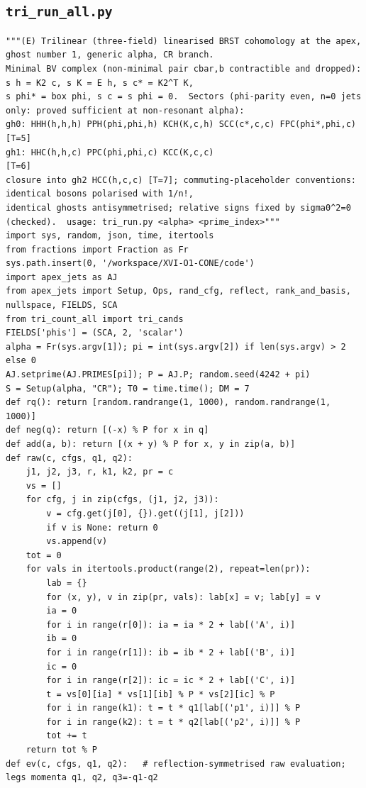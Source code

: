 \documentclass[10pt]{article}
\begin{document}
\subsection{\texttt{tri\_run\_all.py}}
\begin{lstlisting}
"""(E) Trilinear (three-field) linearised BRST cohomology at the apex, ghost number 1, generic alpha, CR branch.
Minimal BV complex (non-minimal pair cbar,b contractible and dropped): s h = K2 c, s K = E h, s c* = K2^T K,
s phi* = box phi, s c = s phi = 0.  Sectors (phi-parity even, n=0 jets only: proved sufficient at non-resonant alpha):
gh0: HHH(h,h,h) PPH(phi,phi,h) KCH(K,c,h) SCC(c*,c,c) FPC(phi*,phi,c)  [T=5]
gh1: HHC(h,h,c) PPC(phi,phi,c) KCC(K,c,c)                               [T=6]
closure into gh2 HCC(h,c,c) [T=7]; commuting-placeholder conventions: identical bosons polarised with 1/n!,
identical ghosts antisymmetrised; relative signs fixed by sigma0^2=0 (checked).  usage: tri_run.py <alpha> <prime_index>"""
import sys, random, json, time, itertools
from fractions import Fraction as Fr
sys.path.insert(0, '/workspace/XVI-O1-CONE/code')
import apex_jets as AJ
from apex_jets import Setup, Ops, rand_cfg, reflect, rank_and_basis, nullspace, FIELDS, SCA
from tri_count_all import tri_cands
FIELDS['phis'] = (SCA, 2, 'scalar')
alpha = Fr(sys.argv[1]); pi = int(sys.argv[2]) if len(sys.argv) > 2 else 0
AJ.setprime(AJ.PRIMES[pi]); P = AJ.P; random.seed(4242 + pi)
S = Setup(alpha, "CR"); T0 = time.time(); DM = 7
def rq(): return [random.randrange(1, 1000), random.randrange(1, 1000)]
def neg(q): return [(-x) % P for x in q]
def add(a, b): return [(x + y) % P for x, y in zip(a, b)]
def raw(c, cfgs, q1, q2):
    j1, j2, j3, r, k1, k2, pr = c
    vs = []
    for cfg, j in zip(cfgs, (j1, j2, j3)):
        v = cfg.get(j[0], {}).get((j[1], j[2]))
        if v is None: return 0
        vs.append(v)
    tot = 0
    for vals in itertools.product(range(2), repeat=len(pr)):
        lab = {}
        for (x, y), v in zip(pr, vals): lab[x] = v; lab[y] = v
        ia = 0
        for i in range(r[0]): ia = ia * 2 + lab[('A', i)]
        ib = 0
        for i in range(r[1]): ib = ib * 2 + lab[('B', i)]
        ic = 0
        for i in range(r[2]): ic = ic * 2 + lab[('C', i)]
        t = vs[0][ia] * vs[1][ib] % P * vs[2][ic] % P
        for i in range(k1): t = t * q1[lab[('p1', i)]] % P
        for i in range(k2): t = t * q2[lab[('p2', i)]] % P
        tot += t
    return tot % P
def ev(c, cfgs, q1, q2):   # reflection-symmetrised raw evaluation; legs momenta q1, q2, q3=-q1-q2

\end{lstlisting}
\end{document}
